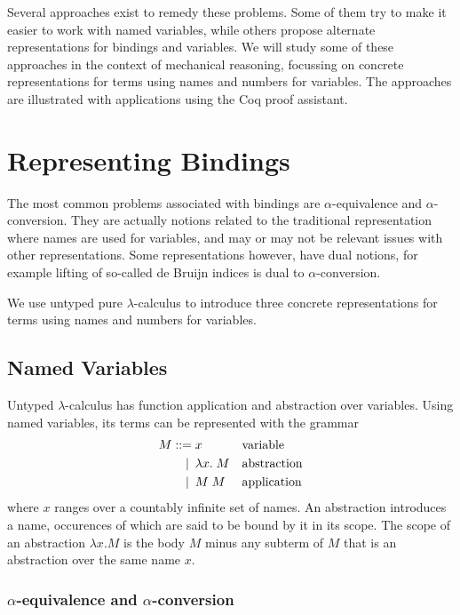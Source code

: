 \documentclass[a4paper,11pt]{article}
\begin{document}
Several approaches exist to remedy these problems.
Some of them try to make it easier to work with named variables, while
others propose alternate representations for bindings and variables.
We will study some of these approaches in the context of mechanical
reasoning, focussing on concrete representations for terms using names
and numbers for variables.
The approaches are illustrated with applications using the Coq proof
assistant.


\section{Representing Bindings}\label{sec:representing}

The most common problems associated with bindings are $\alpha$-equivalence
and $\alpha$-conversion.
They are actually notions related to the traditional representation where
names are used for variables, and may or may not be relevant issues with
other representations.
Some representations however, have dual notions, for example lifting of
so-called de Bruijn indices is dual to $\alpha$-conversion.

We use untyped pure $\lambda$-calculus \cite{Barendregt-84} to introduce
three concrete representations for terms using names and numbers for
variables.


\subsection{Named Variables}

Untyped $\lambda$-calculus has function application and abstraction over
variables. Using named variables, its terms can be represented with the
grammar
\begin{align*}
  M ::=             &\; x
  && \text{variable} \\
  \llap{\textbar\:} &\; \lambda x. \; M
  && \text{abstraction} \\
  \llap{\textbar\:} &\; M \; M
  && \text{application}
\end{align*}
where $x$ ranges over a countably infinite set of names.
An abstraction introduces a name, occurences of which are said to be
bound by it in its scope. The scope of an abstraction $\lambda x.M$ is
the body $M$ minus any subterm of $M$ that is an abstraction over the
same name $x$.

\subsubsection*{$\alpha$-equivalence and $\alpha$-conversion}
\end{document}
